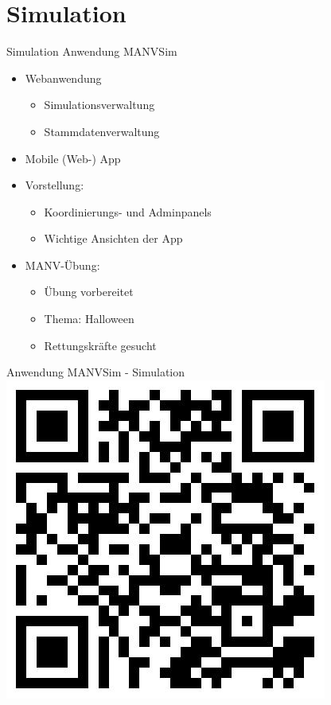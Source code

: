 
\section{Simulation}

\begin{frame}{Simulation}
	Anwendung MANVSim
	\begin{itemize}
		\item Webanwendung
		\begin{itemize}
			\item Simulationsverwaltung
			\item Stammdatenverwaltung
		\end{itemize}
		\item Mobile (Web-) App
		\item Vorstellung:
		\begin{itemize}
			\item Koordinierungs- und Adminpanels
			\item Wichtige Ansichten der App
		\end{itemize}
		\item MANV-Übung:
		\begin{itemize}
			\item Übung vorbereitet
			\item Thema: Halloween
			\item Rettungskräfte gesucht
		\end{itemize}
	\end{itemize}
\end{frame}

\begin{frame}{Anwendung MANVSim - Simulation}
	\centering
	\includegraphics[height=0.8\textheight]{images/qrcode.jpeg}
\end{frame}
